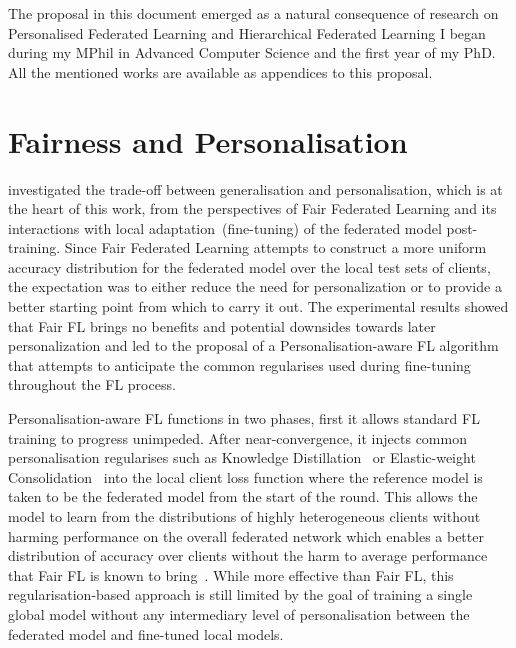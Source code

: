 The proposal in this document emerged as a natural consequence of research on Personalised Federated Learning and Hierarchical Federated Learning I began during my MPhil in Advanced Computer Science and the first year of my PhD. All the mentioned works are available as appendices to this proposal.

\section{Fairness and Personalisation}

\citet{EuroMLSysWorkshop} investigated the trade-off between generalisation and personalisation, which is at the heart of this work, from the perspectives of Fair Federated Learning and its interactions with local adaptation~(fine-tuning) of the federated model post-training. Since Fair Federated Learning attempts to construct a more uniform accuracy distribution for the federated model over the local test sets of clients, the expectation was to either reduce the need for personalization or to provide a better starting point from which to carry it out. The experimental results showed that Fair FL brings no benefits and potential downsides towards later personalization and led to the proposal of a Personalisation-aware FL algorithm that attempts to anticipate the common regularises used during fine-tuning throughout the FL process.

Personalisation-aware FL functions in two phases, first it allows standard FL training to progress unimpeded. After near-convergence, it injects common personalisation regularises such as Knowledge Distillation~\citep{DistillingKnowledgeInNeuralNetworks,DeepMutualLearning} or Elastic-weight Consolidation~\citep{EWC} into the local client loss function where the reference model is taken to be the federated model from the start of the round. This allows the model to learn from the distributions of highly heterogeneous clients without harming performance on the overall federated network which enables a better distribution of accuracy over clients without the harm to average performance that Fair FL is known to bring~\citep{QFedAvg,TERM}. While more effective than Fair FL, this regularisation-based approach is still limited by the goal of training a single global model without any intermediary level of personalisation between the federated model and fine-tuned local models.

